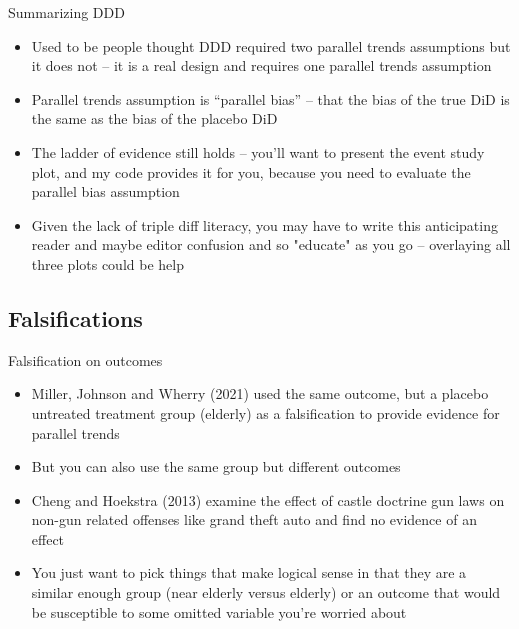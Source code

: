 \documentclass{beamer}
\begin{document}
\begin{frame}{Summarizing DDD}

\begin{itemize}
\item Used to be people thought DDD required two parallel trends assumptions but it does not -- it is a real design and requires one parallel trends assumption
\item Parallel trends assumption is ``parallel bias'' -- that the bias of the true DiD is the same as the bias of the placebo DiD
\item The ladder of evidence still holds -- you'll want to present the event study plot, and my code provides it for you, because you need to evaluate the parallel bias assumption
\item Given the lack of triple diff literacy, you may have to write this anticipating reader and maybe editor confusion and so "educate" as you go -- overlaying all three plots could be help

\end{itemize}

\end{frame}


\subsection{Falsifications}

\begin{frame}{Falsification on outcomes}
	
	\begin{itemize}
	\item Miller, Johnson and Wherry (2021) used the same outcome, but a placebo untreated treatment group (elderly) as a falsification to provide evidence for parallel trends
	\item But you can also use the same group but different outcomes
	\item Cheng and Hoekstra (2013) examine the effect of castle doctrine gun laws on non-gun related offenses like grand theft auto and find no evidence of an effect 
	\item You just want to pick things that make logical sense in that they are a similar enough group (near elderly versus elderly) or an outcome that would be susceptible to some omitted variable you're worried about
	\end{itemize}
\end{frame}
\end{document}
